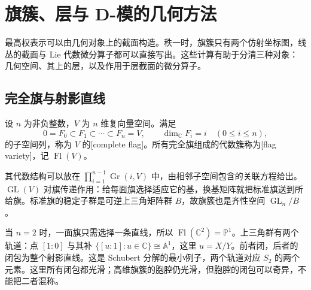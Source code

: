 
\section{旗簇、层与 D-模的几何方法}
\label{b5:sec:C04}

%
%

最高权表示可以由几何对象上的截面构造。秩一时，旗簇只有两个仿射坐标图，线丛的截面与 Lie 代数微分算子都可以直接写出。这些计算有助于分清三种对象：几何空间、其上的层，以及作用于层截面的微分算子。

\subsection{完全旗与射影直线}
\label{b5:subsec:C04:01}

\begin{definition}\label{b5:def:complete-flag}
	设 \(n\) 为非负整数，\(V\) 为 \(n\) 维复向量空间。满足
	\[
		0=F_0\subset F_1\subset\cdots\subset F_n=V, \qquad\dim_{\mathbb C} F_i=i\quad(0\le i\le n),
	\]
	的子空间列，称为 \(V\) 的[complete flag]。所有完全旗组成的代数簇称为[flag variety]，记 \(\operatorname{Fl}(V)\)。
\end{definition}

其代数结构可以放在 \(\prod_{i=1}^{n-1}\operatorname{Gr}(i,V)\) 中，由相邻子空间包含的关联方程给出。\(\operatorname{GL}(V)\) 对旗传递作用：给每面旗选择适应它的基，换基矩阵就把标准旗送到所给旗。标准旗的稳定子群是可逆上三角矩阵群 \(B\)，故旗簇也是齐性空间 \(\operatorname{GL}_n/B\)。

\ProseParagraphBreak
当 \(n=2\) 时，一面旗只需选择一条直线，所以 \(\operatorname{Fl}(\mathbb C^2)=\mathbb P^1\)。上三角群有两个轨道：点 \([1:0]\) 与其补 \(\bigl\{[u:1]:u\in\mathbb C\bigr\}\cong\mathbb A^1\)，这里 \(u=X/Y\)。前者闭，后者的闭包为整个射影直线。这是 Schubert 分解的最小例子，两个轨道对应 \(S_2\) 的两个元素。这里所有闭包都光滑；高维旗簇的胞腔仍光滑，但胞腔的闭包可以奇异，不能把二者混称。

